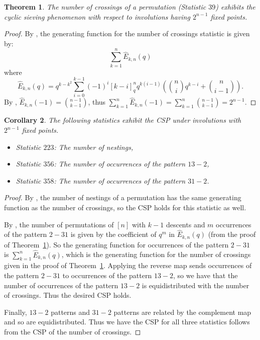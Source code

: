 \documentclass{amsart}
\newtheorem{thm}{Theorem}[section]
\newtheorem{cor}[thm]{Corollary}
\theoremstyle{definition}
\begin{document}
\begin{thm}\label{thm: Corteel-crossings CSP}
  The number of crossings of a permutation (Statistic $39$) exhibits the cyclic sieving phenomenon with respect to involutions having $2^{n-1}$ fixed points.
\end{thm}

\begin{proof}
  By \cite[Theorem 2]{corteel2007crossings}, the generating function for the number of crossings statistic is given by:
  \[\sum_{k=1}^n\hat{E}_{k,n}(q)\] where
  \[\hat{E}_{k,n}(q)=q^{k-k^2}\sum_{i=0}^{k-1}(-1)^i[k-i]_q^n q^{k(i-1)}\left(\binom{n}{i}q^{k-i}+\binom{n}{i-1}\right).
  \]
  By \cite[Proposition 5.7]{LW2005}, $\hat{E}_{k,n}(-1)=\binom{n-1}{k-1}$, thus $\sum_{k=1}^n\hat{E}_{k,n}(-1)=\sum_{k=1}^n\binom{n-1}{k-1}=2^{n-1}$.
\end{proof}


\begin{cor}\label{cor: Corteel-crossings CSP}
  The following statistics exhibit the CSP under involutions with $2^{n-1}$ fixed points.
  \begin{itemize}
    \item Statistic $223$: The number of nestings,
    \item Statistic $356$: The number of occurrences of the pattern $13-2$,
    \item Statistic $358$: The number of occurrences of the pattern $31-2$.
  \end{itemize}
\end{cor}


\begin{proof}
  By \cite[Proposition 4]{corteel2007crossings}, the number of nestings of a permutation has the same generating function as the number of crossings, so the CSP holds for this statistic as well.

  By \cite[Corollary 30]{SteingrimssonWilliams2007}, the number of permutations of $[n]$ with $k-1$ descents and $m$ occurrences of the pattern $2-31$ is given by the coefficient of $q^m$ in $\hat{E}_{k,n}(q)$ (from the proof of Theorem~\ref{thm: Corteel-crossings CSP}). So the generating function for occurrences of the pattern $2-31$ is $\sum_{k=1}^{n}\hat{E}_{k,n}(q)$, which is the generating function for the number of crossings given in the proof of Theorem~\ref{thm: Corteel-crossings CSP}. Applying the reverse map sends occurrences of the pattern $2-31$ to occurrences of the pattern $13-2$, so we have that the number of occurrences of the pattern $13-2$ is equidistributed with the number of crossings. Thus the desired CSP holds.

  Finally, $13-2$ patterns and $31-2$ patterns are related by the complement map and so are equidistributed. Thus we have the CSP for all three statistics follows from the CSP of the number of crossings.
\end{proof}
\end{document}
